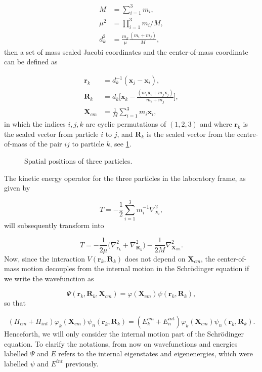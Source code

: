 \begin{align}
M &= \sum_{i=1}^{3}m_i,  \label{eq:3,1} \\
\mu^2 &= \prod_{i=1}^{3}m_i/M,  \label{eq:3,2}\\
d_k^2 &= \frac{m_k}{\mu}\frac{(m_i+m_j)}{M},  \label{eq:3,3}
\end{align}
then a set of mass scaled Jacobi coordinates and the center-of-mass coordinate can be defined as

\begin{align}
\mathbf{r}_k &= d^{-1}_k(\mathbf{x}_{j}-\mathbf{x}_{i}),  \label{eq:4_1} \\
\mathbf{R}_k &= d_k\Big[\mathbf{x}_{k}-\frac{(m_{i}\mathbf{x}_{i}+m_{j}\mathbf{x}_{j})}{m_{i}+m_{j}}\Big],  \label{eq:4_2}\\
\mathbf{X}_{cm} &= \frac{1}{M} \sum_{i=1}^{3} m_{i} \mathbf{x}_{i},  \label{eq:4_3}
\end{align}   
in which the indices $i,j,k$ are cyclic permutations of $(1,2,3)$ and where $\mathbf{r}_k$ is the scaled vector from particle $i$ to $j$, and $\mathbf{R}_k$ is the scaled vector from the centre-of-mass of the pair $ij$ to particle $k$, see \cref{fig:1}.
\begin{figure}
	\centering
	
	\caption{Spatial positions of three particles.}
	\label{fig:1}
\end{figure}
The kinetic energy operator for the three particles in the laboratory frame, as given by 

\begin{equation}\label{eq:5}
T = -\frac{1}{2} \sum_{i=1}^{3} m_{i}^{-1} \nabla^{2}_{\mathbf{x}_{i}}, 
\end{equation}
will subsequently transform into

\begin{equation}\label{eq:6}
T = -\frac{1}{2\mu} \Big(\nabla^{2}_{\mathbf{r}_{k}}+\nabla^{2}_{\mathbf{R}_{k}}\Big) - \frac{1}{2 M}\nabla^{2}_{\mathbf{X}_{cm}}. 
\end{equation}
Now, since the interaction $V(\mathbf{r}_k,\mathbf{R}_k)$ does not depend on $\mathbf{X}_{cm}$, the center-of-mass motion decouples from the internal motion in the Schr{\"o}dinger equation if we write the wavefunction as

\begin{equation}
\Psi(\mathbf{r}_k,\mathbf{R}_k,\mathbf{X}_{cm}) = \varphi(\mathbf{X}_{cm})\psi(\mathbf{r}_k,\mathbf{R}_k),
\end{equation}
so that

\begin{equation}
(H_{cm} + H_{int})\varphi_{k}(\mathbf{X}_{cm})\psi_{n}(\mathbf{r}_k,\mathbf{R}_k) = (E_k^{cm} + E_n^{int})\varphi_{k}(\mathbf{X}_{cm})\psi_{n}(\mathbf{r}_k,\mathbf{R}_k).
\end{equation}
Henceforth, we will only consider the internal motion part of the  Schr{\"o}dinger equation. To clarify the notations, from now on wavefunctions and energies labelled $\Psi$ and $E$ refers to the internal eigenstates and eigenenergies, which were labelled $\psi$ and $E^{int}$ previously. 

